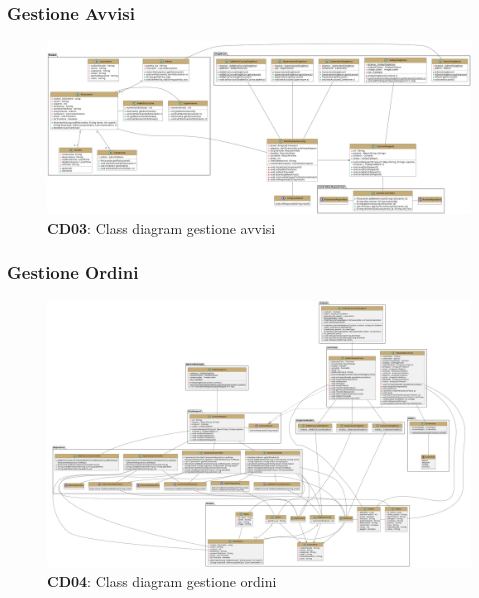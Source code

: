     \subsubsection{Gestione Avvisi}
        \begin{figure}[H]
            \centering
            \includegraphics[scale=0.15]{assets/diagrammi/Class diagram di design/ClassDiagramGestioneAvvisi.png}
            \caption*{\textbf{CD03}: Class diagram gestione avvisi}\label{fig:ClassDiagram_ManageAdv}
        \end{figure}

    \subsubsection{Gestione Ordini}
        \begin{figure}[H]
            \centering
            \includegraphics[scale=0.15]{assets/diagrammi/Class diagram di design/Class Diagramm Design Gestione Ordini.png}
            \caption*{\textbf{CD04}: Class diagram gestione ordini}\label{fig:ClassDiagram_ManageOrders}
        \end{figure}

